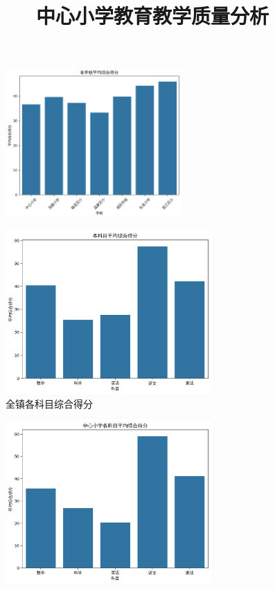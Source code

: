 \documentclass{article}
\title{中心小学教育教学质量分析}
\author{}
\begin{document}
\maketitle



\begin{figure}[H]
    \centering
    \includegraphics[width=0.6\textwidth]{fig/1.png}
\end{figure}

\begin{figure}[H]
    \centering
    \includegraphics[width=0.7\textwidth]{fig/2.png}
    \caption{全镇各科目综合得分}
\end{figure}

\begin{figure}[H]
    \centering
    \includegraphics[width=0.7\textwidth]{fig/3.png}
\end{figure}
\end{document}
